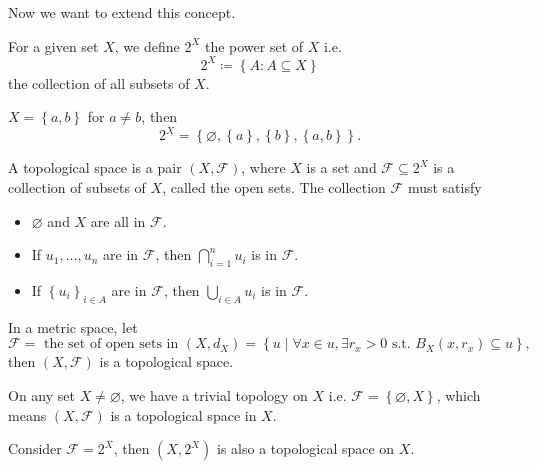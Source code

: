 Now we want to extend this concept. 
\begin{definition} \label{def: power sets}
    For a given set \(X\), we define \(2^X\) the power set of \(X\) i.e. 
    \[
        2^X \coloneqq \left\{ A:A\subseteq X \right\} 
    \] the collection of all subsets of \(X\). 
\end{definition}

\begin{eg}
    \(X = \left\{ a, b \right\} \) for \(a \neq b\), then 
    \[
        2^X = \left\{ \varnothing , \left\{ a \right\}, \left\{ b \right\}, \left\{ a, b \right\}    \right\}. 
    \]  
\end{eg}

\begin{definition} \label{def: topological space}
    A topological space is a pair \(\left( X, \mathcal{F}  \right) \), where \(X\) is a set and \(\mathcal{F} \subseteq 2^X \) is a collection of subsets of \(X\), called the open sets. The collection \(\mathcal{F} \) must satisfy 
    \begin{itemize}
        \item \(\varnothing  \) and \(X\) are all in \(\mathcal{F} \). 
        \item  If \(u_1, \dots , u_n\) are in \(\mathcal{F} \), then \(\bigcap_{i=1}^{n} u_i \) is in \(\mathcal{F} \). 
        \item If \(\left\{ u_i \right\}_{i \in A} \) are in \(\mathcal{F} \), then \(\bigcup_{i \in A} u_{i} \) is in \(\mathcal{F} \).       
\end{itemize}    
\end{definition}

\begin{remark}
    In a metric space, let 
    \[
        \mathcal{F} = \text{ the set of open sets in } (X, d_X) = \left\{ u \mid \forall x \in u, \exists r_x > 0 \text{ s.t. } B_X(x, r_x) \subseteq u \right\}, 
    \] then \((X, \mathcal{F}) \) is a topological space.  
\end{remark}

\begin{eg}
    On any set \(X \neq \varnothing \), we have a trivial topology on \(X\) i.e. \(\mathcal{F} = \left\{ \varnothing , X \right\} \), which means \((X, \mathcal{F} )\) is a topological space in \(X\).  
\end{eg}

\begin{eg}
    Consider \(\mathcal{F} = 2^X\), then \((X, 2^X)\) is also a topological space on \(X\).    
\end{eg}

